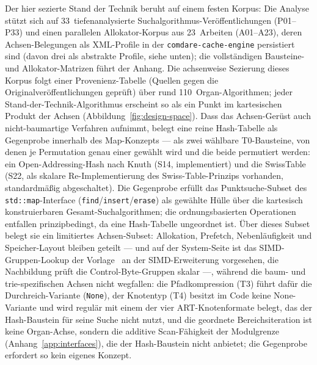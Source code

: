\begin{nurlang}
Der hier sezierte Stand der Technik beruht auf einem festen Korpus: Die Analyse stützt sich
auf 33~tiefenanalysierte Suchalgorithmus-Veröffentlichungen (P01--P33) und einen parallelen
Allokator-Korpus aus 23~Arbeiten (A01--A23), deren Achsen-Belegungen als XML-Profile in der
\texttt{comdare-cache-engine} persistiert sind (davon drei als abstrakte Profile, siehe unten); die
vollständigen Bausteine- und Allokator-Matrizen führt der Anhang. Die achsenweise Sezierung dieses Korpus
folgt einer Provenienz-Tabelle (Quellen gegen die Originalveröffentlichungen geprüft) über
rund 110~Organ-Algorithmen; jeder
Stand-der-Technik-Algorithmus erscheint so als ein Punkt im kartesischen Produkt der Achsen
(Abbildung~\ref{fig:design-space}). Dass das Achsen-Gerüst auch nicht-baumartige Verfahren aufnimmt, belegt
eine reine Hash-Tabelle als Gegenprobe innerhalb des Map-Konzepts --- als zwei wählbare
T0-Bausteine, von denen je Permutation genau einer gewählt wird und die beide permutiert werden: ein
Open-Addressing-Hash nach Knuth (S14, implementiert) und die SwissTable~\cite{abseil_swisstable}
(S22, als skalare Re-Implementierung des Swiss-Table-Prinzips vorhanden, standardmäßig
abgeschaltet). Die Gegenprobe erfüllt das Punktsuche-Subset des
\texttt{std::map}-Interface (\texttt{find}/\texttt{insert}/\texttt{erase}) als gewählte Hülle über die kartesisch konstruierbaren Gesamt-Suchalgorithmen; die ordnungsbasierten
Operationen entfallen prinzipbedingt, da eine Hash-Tabelle ungeordnet ist. Über dieses Subset belegt sie
ein limitiertes Achsen-Subset: Allokation, Prefetch, Nebenläufigkeit und Speicher-Layout bleiben
geteilt --- und auf der System-Seite ist das SIMD-Gruppen-Lookup der
Vorlage~\cite{abseil_swisstable} an der SIMD-Erweiterung vorgesehen, die Nachbildung prüft die
Control-Byte-Gruppen skalar ---,
während die baum- und trie-spezifischen Achsen nicht wegfallen: die Pfadkompression (T3) führt dafür
die Durchreich-Variante (\texttt{None}), der Knotentyp (T4) besitzt im Code keine None-Variante und wird
regulär mit einem der vier ART-Knotenformate belegt, das der Hash-Baustein für seine Suche nicht nutzt,
und die geordnete Bereichsiteration ist keine Organ-Achse, sondern die additive Scan-Fähigkeit der
Modulgrenze (Anhang~\ref{app:interfaces}), die der Hash-Baustein nicht anbietet; die Gegenprobe
erfordert so kein eigenes Konzept.
\end{nurlang}
